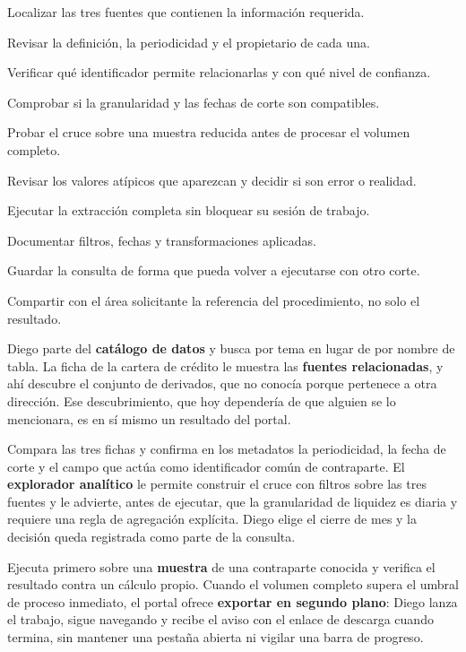 \begin{uxpreg}
\item Localizar las tres fuentes que contienen la información requerida.
\item Revisar la definición, la periodicidad y el propietario de cada una.
\item Verificar qué identificador permite relacionarlas y con qué nivel de confianza.
\item Comprobar si la granularidad y las fechas de corte son compatibles.
\item Probar el cruce sobre una muestra reducida antes de procesar el volumen completo.
\item Revisar los valores atípicos que aparezcan y decidir si son error o realidad.
\item Ejecutar la extracción completa sin bloquear su sesión de trabajo.
\item Documentar filtros, fechas y transformaciones aplicadas.
\item Guardar la consulta de forma que pueda volver a ejecutarse con otro corte.
\item Compartir con el área solicitante la referencia del procedimiento, no solo el resultado.
\end{uxpreg}


Diego parte del \textbf{catálogo de datos} y busca por tema en lugar de por nombre de tabla.
La ficha de la cartera de crédito le muestra las \textbf{fuentes relacionadas}, y ahí descubre
el conjunto de derivados, que no conocía porque pertenece a otra dirección. Ese
descubrimiento, que hoy dependería de que alguien se lo mencionara, es en sí mismo un
resultado del portal.

Compara las tres fichas y confirma en los metadatos la periodicidad, la fecha de corte y el
campo que actúa como identificador común de contraparte. El \textbf{explorador analítico} le
permite construir el cruce con filtros sobre las tres fuentes y le advierte, antes de
ejecutar, que la granularidad de liquidez es diaria y requiere una regla de agregación
explícita. Diego elige el cierre de mes y la decisión queda registrada como parte de la
consulta.

Ejecuta primero sobre una \textbf{muestra} de una contraparte conocida y verifica el resultado
contra un cálculo propio. Cuando el volumen completo supera el umbral de proceso inmediato, el
portal ofrece \textbf{exportar en segundo plano}: Diego lanza el trabajo, sigue navegando y
recibe el aviso con el enlace de descarga cuando termina, sin mantener una pestaña abierta ni
vigilar una barra de progreso.

